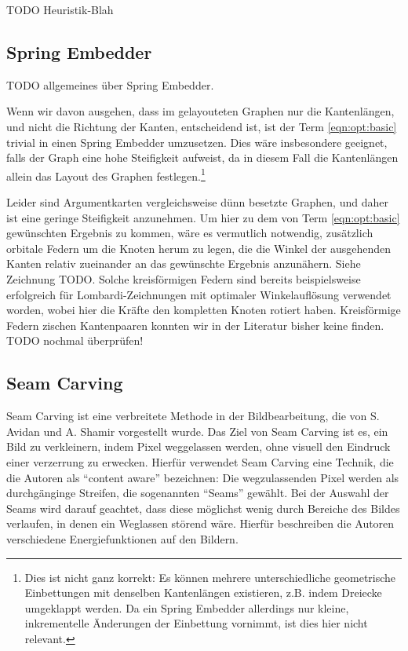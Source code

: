TODO Heuristik-Blah

\subsection{Spring Embedder}

TODO allgemeines über Spring Embedder.\cite{kobourov2012spring}

Wenn wir davon ausgehen, dass im gelayouteten Graphen nur die Kantenlängen, und nicht die Richtung der Kanten, entscheidend ist, ist der Term \ref{eqn:opt:basic} trivial in einen Spring Embedder umzusetzen. Dies wäre insbesondere geeignet, falls der Graph eine hohe Steifigkeit aufweist, da in diesem Fall die Kantenlängen allein das Layout des Graphen festlegen.\footnote{Dies ist nicht ganz korrekt: Es können mehrere unterschiedliche geometrische Einbettungen mit denselben Kantenlängen existieren, z.B. indem Dreiecke umgeklappt werden. Da ein Spring Embedder allerdings nur kleine, inkrementelle Änderungen der Einbettung vornimmt, ist dies hier nicht relevant.}

Leider sind Argumentkarten vergleichsweise dünn besetzte Graphen, und daher ist eine geringe Steifigkeit anzunehmen. Um hier zu dem von Term \ref{eqn:opt:basic} gewünschten Ergebnis zu kommen, wäre es vermutlich notwendig, zusätzlich orbitale Federn um die Knoten herum zu legen, die die Winkel der ausgehenden Kanten relativ zueinander an das gewünschte Ergebnis anzunähern. Siehe Zeichnung TODO. Solche kreisförmigen Federn sind bereits beispielsweise erfolgreich für Lombardi-Zeichnungen mit optimaler Winkelauflösung verwendet worden\cite{chernobelskiy2012force}, wobei hier die Kräfte den kompletten Knoten rotiert haben. Kreisförmige Federn zischen Kantenpaaren konnten wir in der Literatur bisher keine finden. TODO nochmal überprüfen!

\subsection{Seam Carving}

Seam Carving ist eine verbreitete Methode in der Bildbearbeitung, die von S. Avidan und A. Shamir vorgestellt wurde.\cite{avidan2007seam} Das Ziel von Seam Carving ist es, ein Bild zu verkleinern, indem Pixel weggelassen werden, ohne visuell den Eindruck einer verzerrung zu erwecken. Hierfür verwendet Seam Carving eine Technik, die die Autoren als "`content aware"' bezeichnen: Die wegzulassenden Pixel werden als durchgänginge Streifen, die sogenannten "`Seams"' gewählt. Bei der Auswahl der Seams wird darauf geachtet, dass diese möglichst wenig durch Bereiche des Bildes verlaufen, in denen ein Weglassen störend wäre. Hierfür beschreiben die Autoren verschiedene Energiefunktionen auf den Bildern.

